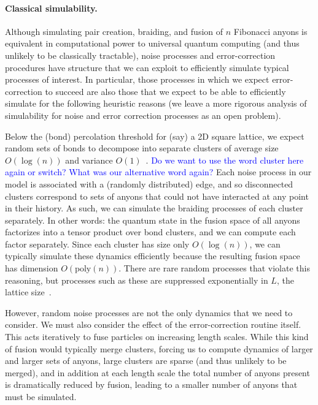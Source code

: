 \documentclass[aps, prl, letterpaper, twocolumn, superscriptaddress, notitlepage, 10pt]{revtex4-1}
\newcommand{\cggb}[1]{\textcolor{blue}{#1}}
\begin{document}
\paragraph{Classical simulability.}

Although simulating pair creation, braiding, and fusion of $n$ Fibonacci anyons is equivalent 
in computational power to universal quantum computing (and thus unlikely to be classically 
tractable), noise processes and error-correction procedures have structure that we can 
exploit to efficiently simulate typical processes of interest. In particular, those 
processes in which we expect error-correction to succeed are also those that we expect to 
be able to efficiently simulate for the following heuristic reasons (we leave a more rigorous analysis of simulability for noise and error correction processes as an open problem).

Below the (bond) percolation threshold for (say) a 2D square lattice, we expect random sets of 
bonds to decompose into separate clusters of average size $O(\log(n))$ and variance 
$O(1)$~\cite{Bazant2000}. \cggb{Do we want to use the word cluster here again or switch? What was our alternative word again?} 
Each noise process in our model is associated with a (randomly distributed) edge, and so 
disconnected clusters correspond to sets of anyons that could not have interacted at any 
point in their history. As such, we can simulate the braiding processes of each cluster 
separately. In other words: the quantum state in the fusion space of all anyons factorizes into 
a tensor product over bond clusters, and we can compute each factor separately. Since each 
cluster has size only $O(\log(n))$, we can typically simulate these dynamics efficiently 
because the resulting fusion space has dimension $O(\mathrm{poly}(n))$. There are rare 
random processes that violate this reasoning, but processes such as these are suppressed 
exponentially in $L$, the lattice size~\cite{Grimmett1989}. 

However, random noise processes are not the only dynamics that we need to consider. We 
must also consider the effect of the error-correction routine itself. This acts iteratively to fuse 
particles on increasing length scales. While this kind of fusion would typically merge clusters, 
forcing us to compute dynamics of larger and larger sets of anyons, large clusters are sparse 
(and thus unlikely to be merged), and in addition at each length scale the total number of 
anyons present is dramatically reduced by fusion, leading to a smaller number of anyons that 
must be simulated.
\end{document}
